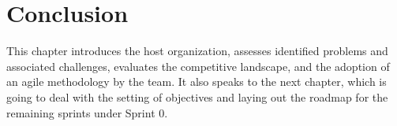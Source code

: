 \setcounter{secnumdepth}{0} %
\section{Conclusion}
This chapter introduces the host organization, assesses identified problems and associated challenges, evaluates the competitive landscape, and the adoption of an agile methodology by the team. It also speaks to the next chapter, which is going to deal with the setting of objectives and laying out the roadmap for the remaining sprints under Sprint 0.
